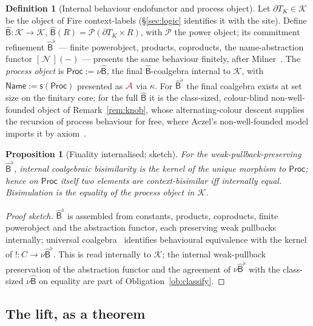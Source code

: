 \documentclass[11pt]{article}
\newcommand{\Proc}{\mathsf{Proc}}
\newcommand{\Name}{\mathsf{Name}}
\newcommand{\dT}{\partial T}
\newcommand{\Ps}{\mathcal{P}}
\newcommand{\sB}{\widehat{\mathsf{B}}}
\newcommand{\swap}{\mathsf{s}}
\newcommand{\Ks}{\mathcal{K}}
\newcommand{\rc}[1]{\textcolor{redcopy}{#1}}   %
\newcommand{\At}{\rc{\mathcal A}}
\theoremstyle{plain}
\newtheorem{proposition}[theorem]{Proposition}
\theoremstyle{definition}
\newtheorem{definition}[theorem]{Definition}
\theoremstyle{remark}
\begin{document}
\begin{definition}[Internal behaviour endofunctor and process object]\label{def:Blift}
Let $\dT_K\in\Ks$ be the object of Fire context-labels (\S\ref{sec:logic} identifies it with the
site). Define $\sB\colon\Ks\to\Ks$, $\sB(R)=\Ps(\dT_K\times R)$, with $\Ps$ the power object; its
commitment refinement $\sB^\flat$ --- finite powerobject, products, coproducts, the name-abstraction
functor $[\,\mathcal N\,](-)$ --- presents the same behaviour finitely, after Milner~\cite{milnerpoly,knotrho}. The
\emph{process object} is $\Proc:=\nu\sB$, the final $\sB$-coalgebra internal to $\Ks$, with
$\Name:=\swap(\Proc)$ presented as $\At$ via $\kappa$. For $\sB^\flat$ the final coalgebra exists at
set size on the finitary core; for the full $\sB$ it is the class-sized, colour-blind non-well-founded
object of Remark~\ref{rem:knob}, whose alternating-colour descent supplies the recursion of process
behaviour for free, where Aczel's non-well-founded model imports it by axiom~\cite{aczel}.
\end{definition}

\begin{proposition}[Finality internalised; sketch]\label{prop:final}
For the weak-pullback-preserving $\sB^\flat$, internal coalgebraic bisimilarity is the kernel of the
unique morphism to $\Proc$; hence on $\Proc$ itself two elements are context-bisimilar iff internally
equal. Bisimulation is the equality of the process object in $\Ks$.
\end{proposition}

\begin{proof}[Proof sketch]
$\sB^\flat$ is assembled from constants, products, coproducts, finite powerobject and the abstraction
functor, each preserving weak pullbacks internally; universal coalgebra~\cite{rutten} identifies
behavioural equivalence with the kernel of $!\colon C\to\nu\sB^\flat$. This is
\cite[Lem.~17, Cor.~20]{knotrho} read internally to $\Ks$; the internal weak-pullback preservation of
the abstraction functor and the agreement of $\nu\sB^\flat$ with the class-sized $\nu\sB$ on equality
are part of Obligation~\ref{ob:classify}.
\end{proof}

\subsection{The lift, as a theorem}
\end{document}

